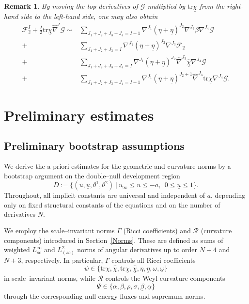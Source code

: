 \documentclass{amsart}
\newtheorem{remark}{Remark}
\newcommand{\ubar}{\underline{u}}
\newcommand{\tr}{\mbox{tr}}
\begin{document}
{\begin{remark}
 By moving the top derivatives of $\mathcal{G}$ multiplied by $\tr\underline{\chi}$ from the right-hand side to the left-hand side, one may also obtain 
\begin{equation}
\label{eq:c2}
\begin{split}
\mathcal{F}^{I}_{2}+\frac{I}{2}\tr\underline{\chi}\hat{\nabla}^{I}\mathcal{G}\sim&\sum_{J_{1}\nonumber+J_{2}+J_{3}+J_{4}=I-1}\nabla^{J_{1}}(\eta+\underline{\eta})^{J_{2}}\nabla^{J_{3}}\beta\nabla^{J_{4}}\mathcal{G}
\\+&\sum_{J_{1}+J_{2}\nonumber+J_{3}=I}\nabla^{J_{1}}(\eta+\underline{\eta})^{J_{2}}\nabla^{J_{3}}\mathcal{F}_{2}\\ +&\sum_{J_{1}+J_{2}+J_{3} +J_{4}=I}\nabla^{J_{1}}(\eta+\underline{\eta})^{J_{2}}\hat{\nabla}^{J_{3}}\widehat{\underline{\chi}}\nabla^{J_{4}}\mathcal{G}\\\nonumber+&\sum_{J_{1}+J_{2}+J_{3} +J_{4}=I-1}\nabla^{J_{1}}(\eta+\underline{\eta})^{J_{2}+1}\hat{\nabla}^{J_{3}}\tr\underline{\chi}\nabla^{J_{4}}\mathcal{G}.
\end{split}
\end{equation}
\end{remark} 

\section{Preliminary estimates} \label{s3}
\subsection{Preliminary bootstrap assumptions}
\noindent We derive the a priori estimates for the geometric and curvature norms by a bootstrap
argument on the double–null development region
\[
D
:=
\Big\{(u,\ubar,\theta^1,\theta^2)\ \Big|\ 
u_\infty \le u \le -a,\ \ 0\le \ubar \le 1\Big\}.
\]
Throughout, all implicit constants are universal and independent of $a$, depending only on fixed structural constants of the equations and on the number of derivatives $N$.

\medskip
\noindent
We employ the scale–invariant norms $\Gamma$ (Ricci coefficients) and $\mathcal R$
(curvature components) introduced in Section~\ref{Norms}. These are defined as sums of weighted $L^\infty_{sc}$ and $L^2_{(sc)}$ norms of angular derivatives up to order $N+4$ and $N+3$, respectively. In particular, $\Gamma$ controls all Ricci coefficients
\[
\psi \in \{\tr\chi,\hat\chi,\tr\underline\chi,\underline{\hat\chi},
\eta,\underline\eta,\omega,\underline\omega\}
\]
in scale–invariant norms, while $\mathcal R$ controls the Weyl curvature components
\[
\Psi\in\{\alpha,\beta,\rho,\sigma,\underline\beta,\underline\alpha\}
\]
through the corresponding null energy fluxes and supremum norms.

}
\end{document}
